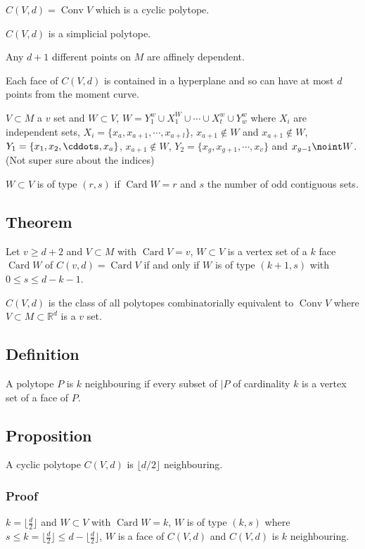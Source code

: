 \documentclass[11pt]{article}
\def\R{\mathbb{R}}
\def\conv{\operatorname{Conv}}
\def\card{\operatorname{Card}}
\begin{document}
{{\(C(V, d) = \conv V\) which is a cyclic polytope.

\(C(V, d)\) is a simplicial polytope. 

Any \(d+1\) different points on \(M\) are affinely dependent.

Each face of \(C(V, d)\) is contained in a hyperplane and so can have at most
\(d\) points from the moment curve.

\(V \subset M\) a \(v\) set and \(W \subset V\), \(W = Y_1^w \cup X_1^W \cup \cdots
   \cup X_t^w \cup Y_w^w\) where \(X_i\) are independent sets, \(X_i = \{x_a,
   x_{a+1}, \cdots, x_{a+l}\}\), \(x_{a+1} \notin W\) and \(x_{a+1} \notin W\), \(Y_1
   = \{x_1, x_2, \cddots, x_a\}\), \(x_{a+1} \notin W\), \(Y_2 = \{x_g, x_{g+1},
   \cdots, x_v\}\) and \(x_{g-1} \noint W\). (Not super sure about the indices)

\(W \subset V\) is of type \((r, s)\) if \(\card W = r\) and \(s\) the number of odd
contiguous sets.
\subsection{Theorem}
\label{sec:org5eedd24}
Let \(v \ge d+2\) and \(V \subset M\) with \(\card V = v\), \(W \subset V\) is a
vertex set of a \(k\) face \(\card W\) of \(C(v, d) = \card V\) if and only if \(W\)
is of type \((k+1, s)\) with \(0 \le s \le d - k - 1\).

\(C(V, d)\) is the class of all polytopes combinatorially equivalent to \(\conv
   V\) where \(V \subset M \subset \R^d\) is a \(v\) set.
\subsection{Definition}
\label{sec:org059b3b9}
A polytope \(P\) is \(k\) neighbouring if every subset of \(\vert P\) of
cardinality \(k\) is a vertex set of a face of \(P\).
\subsection{Proposition}
\label{sec:org3bf8aa7}
A cyclic polytope \(C(V, d)\) is \(\lfloor d/2\rfloor\) neighbouring.
\subsubsection{Proof}
\label{sec:orge1db1cf}
\(k = \lfloor \frac{d}{2} \rfloor\) and \(W \subset V\) with \(\card W = k\), \(W\)
is of type \((k, s)\) where \(s \le k = \lfloor \frac{d}{2} \rfloor \le d -
    \lfloor \frac{d}{2} \rfloor\), \(W\) is a face of \(C(V, d)\) and \(C(V, d)\) is
\(k\) neighbouring.
}}
\end{document}
